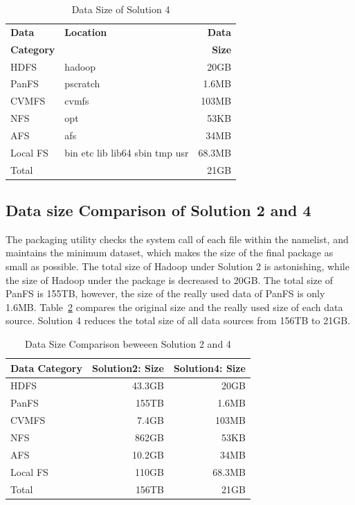 \documentclass{sig-alternate}
\begin{document}
\begin{table}
    \centering
    \begin{tabular}{|l|l|r|}
    \hline
    \bf Data &\bf Location & \bf Data \\ 
    \bf Category & & \bf Size\\ \hline
    HDFS & hadoop &20GB \\ \hline
    PanFS & pscratch & 1.6MB \\ \hline
    CVMFS & cvmfs &103MB \\ \hline 
    NFS & opt &53KB \\ \hline
    AFS & afs &34MB \\ \hline
    Local FS& bin etc lib lib64 sbin tmp usr&68.3MB \\ \hline
    Total & &21GB \\ \hline
    \end{tabular}
    \caption{Data Size of Solution 4}
    \label{table:datasize-3rd}
\end{table}    

\subsection{ Data size Comparison of Solution 2 and 4}

The packaging utility checks the system call of each file within the namelist,
and maintains the minimum dataset, which makes the size of the final package 
as small as possible. The total size of Hadoop under Solution 2 is astonishing,
while the size of Hadoop under the package is decreased to 20GB. 
The total size of PanFS is 155TB, however, the size of the really used data of PanFS is only 1.6MB.
Table~\ref{table:datasize-2nd3rd} compares the original size and the really used size of each data source.
Solution 4 reduces the total size of all data sources from 156TB to 21GB.

\begin{table}
    \centering
    \begin{tabular}{|l|r|r|}
    \hline
    \bf Data Category & \bf Solution2: Size & \bf Solution4: Size \\ \hline
    HDFS & 43.3GB & 20GB \\ \hline
    PanFS & 155TB & 1.6MB \\ \hline
    CVMFS & 7.4GB &103MB \\ \hline
    NFS & 862GB &53KB \\ \hline
    AFS & 10.2GB &34MB \\ \hline
    Local FS& 110GB&68.3MB \\ \hline
    Total & 156TB &21GB \\ \hline
    \end{tabular}
    \caption{Data Size Comparison beweeen Solution 2 and 4}
    \label{table:datasize-2nd3rd}
\end{table}
\end{document}
